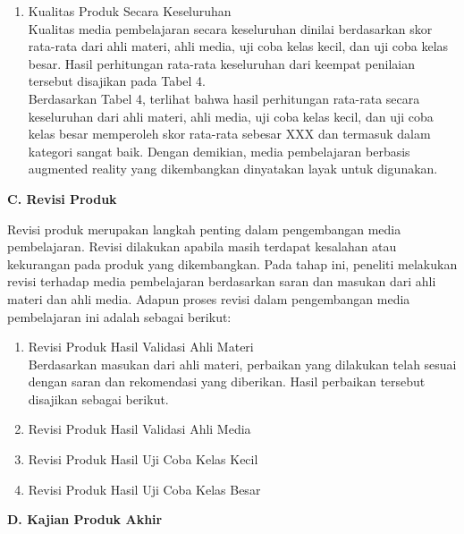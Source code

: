 \documentclass[12pt]{article}
\begin{document}
\begin{enumerate}
    \item Kualitas Produk Secara Keseluruhan\\
    \hspace*{1cm}Kualitas media pembelajaran secara keseluruhan dinilai berdasarkan skor rata-rata dari ahli materi, ahli media, uji coba kelas kecil, dan uji coba kelas besar. Hasil perhitungan rata-rata keseluruhan dari keempat penilaian tersebut disajikan pada Tabel 4.\\
    \hspace*{1cm}Berdasarkan Tabel 4, terlihat bahwa hasil perhitungan rata-rata secara keseluruhan dari ahli materi, ahli media, uji coba kelas kecil, dan uji coba kelas besar memperoleh skor rata-rata sebesar XXX dan termasuk dalam kategori sangat baik. Dengan demikian, media pembelajaran berbasis augmented reality yang dikembangkan dinyatakan layak untuk digunakan.

\end{enumerate}

\textbf{C. Revisi Produk}

\hspace*{1cm}Revisi produk merupakan langkah penting dalam pengembangan media pembelajaran. Revisi dilakukan apabila masih terdapat kesalahan atau kekurangan pada produk yang dikembangkan. Pada tahap ini, peneliti melakukan revisi terhadap media pembelajaran berdasarkan saran dan masukan dari ahli materi dan ahli media. Adapun proses revisi dalam pengembangan media pembelajaran ini adalah sebagai berikut:
\begin{enumerate}
    \item Revisi Produk Hasil Validasi Ahli Materi\\
    \hspace*{1cm}Berdasarkan masukan dari ahli materi, perbaikan yang dilakukan telah sesuai dengan saran dan rekomendasi yang diberikan. Hasil perbaikan tersebut disajikan sebagai berikut.
    \item Revisi Produk Hasil Validasi Ahli Media
    \item Revisi Produk Hasil Uji Coba Kelas Kecil
    \item Revisi Produk Hasil Uji Coba Kelas Besar
\end{enumerate}

\textbf{D. Kajian Produk Akhir}
\end{document}
